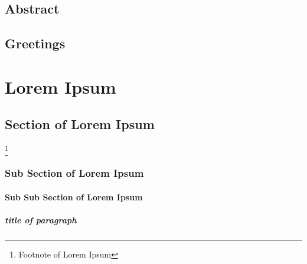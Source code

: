 \documentclass[12pt, a4paper]{report}
\begin{document}
	\arialfont

	\makeutbmfrontcover{}
 
	\section*{Abstract}
	\lipsum[1-3]
	
	\newpage

	\section*{Greetings}
	\lipsum[1-2] 

	\tableofcontents
	\newpage

	\chapter{Lorem Ipsum}
	\section{Section of Lorem Ipsum}
	\lipsum[1-1]\footnote{Footnote of Lorem Ipsum}

	\subsection{Sub Section of Lorem Ipsum}
	\lipsum[1-1]

	\subsubsection{Sub Sub Section of Lorem Ipsum}
	\paragraph{title of paragraph}
	\lipsum[1-1]

	\paragraph{}
	\lipsum[1-1]

	\newpage

	\nocite{*}
	\printbibliography{}

	\makeutbmbackcover{}
\end{document}
